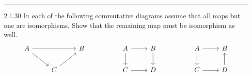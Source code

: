 \documentclass[a4paper, 12pt]{article}
\begin{document}
\noindent\rule{7in}{2.8pt}
\begin{problem}{2.1.30}
In each of the following commutative diagrams assume that all maps but one are isomorphisms. Show that the remaining map must be isomorphism as well. 
\[\begin{tikzcd}
	A && B && A & B && A & B \\
	& C &&& C & D && C & D
	\arrow[from=1-1, to=1-3]
	\arrow[from=1-1, to=2-2]
	\arrow[from=1-5, to=1-6]
	\arrow[from=1-5, to=2-5]
	\arrow[from=1-6, to=2-6]
	\arrow[from=1-8, to=1-9]
	\arrow[from=1-8, to=2-8]
	\arrow[from=2-2, to=1-3]
	\arrow[from=2-5, to=2-6]
	\arrow[from=2-8, to=2-9]
	\arrow[from=2-9, to=1-9]
\end{tikzcd}\]
\end{problem}
\end{document}
